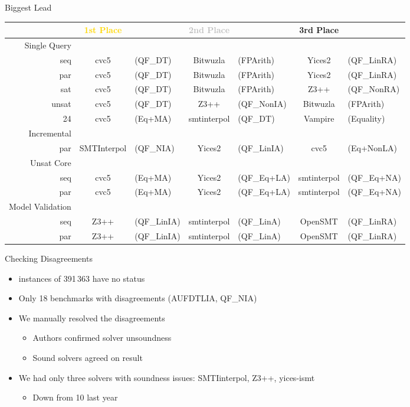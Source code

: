 \documentclass[table]{beamer}
\def\emph#1{\textcolor{MYblue}{#1}}
\newcommand\vitem{\vfill\item}
\begin{document}
\begin{frame}{Biggest Lead}
  \begin{tabular}{r|c@{}lc@{}lc@{}l}
    &\textcolor{gold}{\textbf{1st Place}} &&
    \textcolor{silver}{\textbf{2nd Place}} &&
    \textcolor{bronze}{\textbf{3rd Place}}\\
    \hline
    \emph{Single Query}\\
    seq & cvc5&{\tiny(QF\_DT)} & Bitwuzla&{\tiny(FPArith)} & Yices2&{\tiny(QF\_LinRA)} \\
    par & cvc5&{\tiny(QF\_DT)} & Bitwuzla&{\tiny(FPArith)} & Yices2&{\tiny(QF\_LinRA)} \\
    sat & cvc5&{\tiny(QF\_DT)} & Bitwuzla&{\tiny(FPArith)} & Z3++&{\tiny(QF\_NonRA)} \\
    unsat & cvc5&{\tiny(QF\_DT)} & Z3++&{\tiny(QF\_NonIA)} & Bitwuzla&{\tiny(FPArith)} \\
    24 &  cvc5&{\tiny(Eq+MA)} & smtinterpol&{\tiny(QF\_DT)} & Vampire&{\tiny(Equality)}\\[3pt]
    \pause
    \emph{Incremental}\\
    par & SMTInterpol&{\tiny(QF\_NIA)}
    &Yices2&{\tiny(QF\_LinIA)} & cvc5&{\tiny(Eq+NonLA)} \\[3pt]
    \pause
    \emph{Unsat Core}\\
    seq & cvc5&{\tiny(Eq+MA)} &    Yices2&{\tiny(QF\_Eq+LA)} &    smtinterpol&{\tiny(QF\_Eq+NA)} \\
    par & cvc5&{\tiny(Eq+MA)} &    Yices2&{\tiny(QF\_Eq+LA)} &    smtinterpol&{\tiny(QF\_Eq+NA)} \\
    \pause
    \emph{Model Validation}\\
    seq &  Z3++&{\tiny(QF\_LinIA)} & smtinterpol&{\tiny(QF\_LinA)}        & OpenSMT&{\tiny(QF\_LinRA)} \\
    par &  Z3++&{\tiny(QF\_LinIA)} & smtinterpol&{\tiny(QF\_LinA)}        & OpenSMT&{\tiny(QF\_LinRA)} \\
  \end{tabular}
\end{frame}

\begin{frame}{Checking Disagreements}

  \begin{itemize}
  \item  instances of 391\,363 have no status

  \vitem Only 18 benchmarks with disagreements (AUFDTLIA, QF\_NIA)

  \vitem We manually resolved the disagreements
  \begin{itemize}
    \item Authors confirmed solver unsoundness
    \item Sound solvers agreed on result
  \end{itemize}

  \vitem We had only three solvers with soundness issues: SMTIinterpol, Z3++,
  yices-ismt
  \begin{itemize}
    \item Down from 10 last year
  \end{itemize}
  \end{itemize}
\end{frame}
\end{document}
